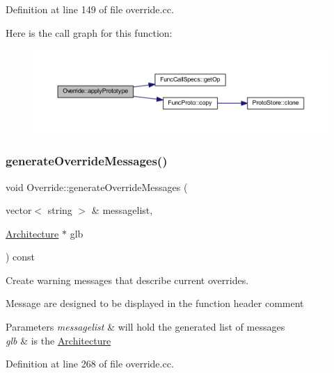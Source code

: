 Definition at line 149 of file override.\+cc.

Here is the call graph for this function\+:
\nopagebreak
\begin{figure}[H]
\begin{center}
\leavevmode
\includegraphics[width=350pt]{class_override_a33eb920b5801c9c7cbd2334b16478ece_cgraph}
\end{center}
\end{figure}
\mbox{\label{class_override_a6d27df21e6a0448729260d0179d35500}} 
\subsubsection{\texorpdfstring{generateOverrideMessages()}{generateOverrideMessages()}}
{\footnotesize\ttfamily void Override\+::generate\+Override\+Messages (\begin{DoxyParamCaption}\item[{vector$<$ string $>$ \&}]{messagelist,  }\item[{\mbox{\hyperlink{class_architecture}{Architecture}} $\ast$}]{glb }\end{DoxyParamCaption}) const}



Create warning messages that describe current overrides. 

Message are designed to be displayed in the function header comment 
\begin{DoxyParams}{Parameters}
{\em messagelist} & will hold the generated list of messages \\
\hline
{\em glb} & is the \mbox{\hyperlink{class_architecture}{Architecture}} \\
\hline
\end{DoxyParams}


Definition at line 268 of file override.\+cc.

